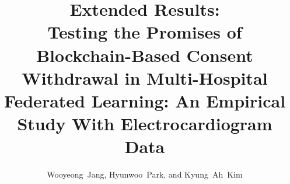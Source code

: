 \documentclass[journal]{IEEEtran}
\begin{document}
\title{Extended Results:\\ Testing the Promises of Blockchain-Based Consent Withdrawal in Multi-Hospital Federated Learning: An Empirical Study With Electrocardiogram Data}
\author{Wooyeong~Jang, Hyunwoo~Park, and Kyung~Ah~Kim}
\maketitle




\end{document}
